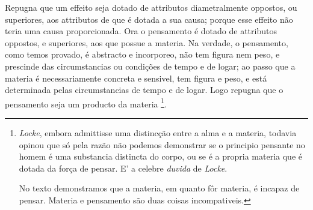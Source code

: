 
Repugna que um effeito seja dotado de attributos diametralmente oppostos, ou superiores, aos attributos de que é dotada a sua causa; porque esse effeito não teria uma causa proporcionada. Ora o pensamento é dotado de attributos oppostos, e superiores, aos que possue a materia. Na verdade, o pensamento, como temos provado, é abstracto e incorporeo, não tem figura nem peso, e prescinde das circumstancias ou condições de tempo e de logar; ao passo que a materia é necessariamente concreta e sensivel, tem figura e peso, e está determinada pelas circumstancias de tempo e de logar. Logo repugna que o pensamento seja um producto da materia \footnote{\emph{Locke}, embora admittisse uma distincção entre a alma e a materia, todavia opinou que só pela razão não podemos demonstrar se o principio pensante no homem é uma substancia distincta do corpo, ou se é a propria materia que é dotada da força de pensar. E' a celebre \emph{duvida} de \emph{Locke}.\par No texto demonstramos que a materia, em quanto fôr materia, é incapaz de pensar. Materia e pensamento são duas coisas incompativeis.}.


